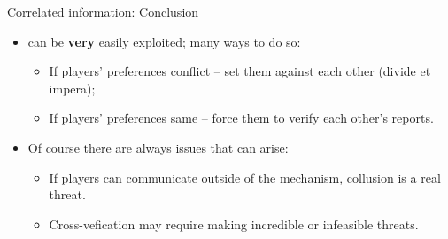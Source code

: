 \documentclass[english,10pt
,aspectratio=169
]{beamer}
\begin{document}
\begin{frame}{Correlated information: Conclusion}
\begin{itemize}
	\item {} can be \alert{\textbf{very} easily exploited}; many ways to do so:
	\begin{itemize}
		\item If players' preferences conflict -- set them against each other (divide et impera);
		\item If players' preferences same -- force them to verify each other's reports.
	\end{itemize}
	\item Of course there are always issues that can arise:
	\begin{itemize}
		\item If players can communicate outside of the mechanism, collusion is a real threat.
		\item Cross-vefication may require making incredible or infeasible threats.
	\end{itemize}
\end{itemize}
\end{frame}


\end{document}
